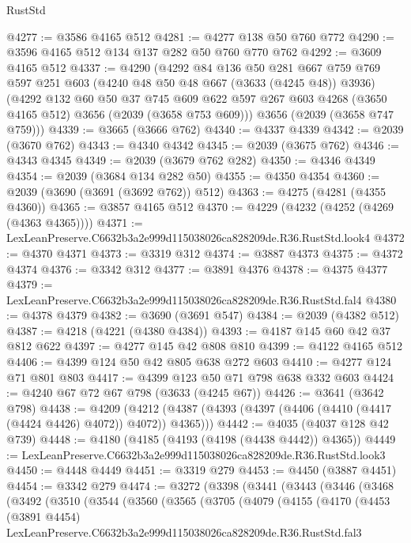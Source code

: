 \begin{lexlean}{RustStd}
\begin{coremodule}
@4277 := @3586 @4165 @512
@4281 := @4277 @138 @50 @760 @772
@4290 := @3596 @4165 @512 @134 @137 @282 @50 @760 @770 @762
@4292 := @3609 @4165 @512
@4337 := @4290
    (@4292
      @84
      @136
      @50
      @281
      @667
      @759
      @769
      @597
      @251
      @603
      (@4240 @48 @50 @48 @667 (@3633 (@4245 @48)) @3936)
      (@4292
        @132
        @60
        @50
        @37
        @745
        @609
        @622
        @597
        @267
        @603
        @4268
        (@3650 @4165 @512)
        @3656
        (@2039 (@3658 @753 @609)))
      @3656
      (@2039 (@3658 @747 @759)))
@4339 := @3665 (@3666 @762)
@4340 := @4337 @4339
@4342 := @2039 (@3670 @762)
@4343 := @4340 @4342
@4345 := @2039 (@3675 @762)
@4346 := @4343 @4345
@4349 := @2039 (@3679 @762 @282)
@4350 := @4346 @4349
@4354 := @2039 (@3684 @134 @282 @50)
@4355 := @4350 @4354
@4360 := @2039 (@3690 (@3691 (@3692 @762)) @512)
@4363 := @4275 (@4281 (@4355 @4360))
@4365 := @3857 @4165 @512
@4370 := @4229 (@4232 (@4252 (@4269 (@4363 @4365))))
@4371 := LexLeanPreserve.C6632b3a2e999d115038026ca828209de.R36.RustStd.look4
@4372 := @4370 @4371
@4373 := @3319 @312
@4374 := @3887 @4373
@4375 := @4372 @4374
@4376 := @3342 @312
@4377 := @3891 @4376
@4378 := @4375 @4377
@4379 := LexLeanPreserve.C6632b3a2e999d115038026ca828209de.R36.RustStd.fal4
@4380 := @4378 @4379
@4382 := @3690 (@3691 @547)
@4384 := @2039 (@4382 @512)
@4387 := @4218 (@4221 (@4380 @4384))
@4393 := @4187 @145 @60 @42 @37 @812 @622
@4397 := @4277 @145 @42 @808 @810
@4399 := @4122 @4165 @512
@4406 := @4399 @124 @50 @42 @805 @638 @272 @603
@4410 := @4277 @124 @71 @801 @803
@4417 := @4399 @123 @50 @71 @798 @638 @332 @603
@4424 := @4240 @67 @72 @67 @798 (@3633 (@4245 @67))
@4426 := @3641 (@3642 @798)
@4438 := @4209
    (@4212 (@4387 (@4393 (@4397 (@4406 (@4410 (@4417 (@4424 @4426) @4072)) @4072)) @4365)))
@4442 := @4035 (@4037 @128 @42 @739)
@4448 := @4180 (@4185 (@4193 (@4198 (@4438 @4442)) @4365))
@4449 := LexLeanPreserve.C6632b3a2e999d115038026ca828209de.R36.RustStd.look3
@4450 := @4448 @4449
@4451 := @3319 @279
@4453 := @4450 (@3887 @4451)
@4454 := @3342 @279
@4474 := @3272
    (@3398
      (@3441
        (@3443
          (@3446
            (@3468
              (@3492
                (@3510
                  (@3544
                    (@3560
                      (@3565
                        (@3705
                          (@4079
                            (@4155
                              (@4170
                                (@4453
                                  (@3891 @4454)
                                  LexLeanPreserve.C6632b3a2e999d115038026ca828209de.R36.RustStd.fal3

\end{coremodule}
\end{lexlean}
